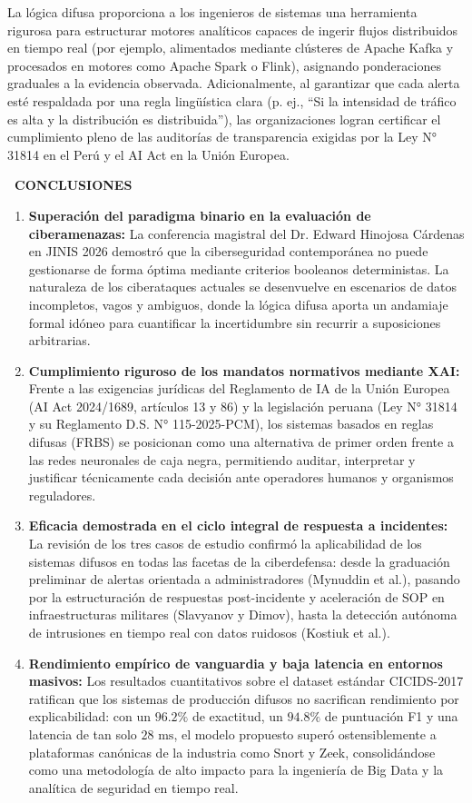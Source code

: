 \documentclass[12pt,a4paper]{article}
\newcommand{\llav}{\symbol{60}\symbol{60}}
\newcommand{\rlav}{\symbol{62}\symbol{62}}
\newcommand{\marcador}[1]{\llav\ #1\ \rlav}
\newcommand{\seccion}[1]{%
  \vspace{0.65cm}%
  {\centering\bfseries\fontsize{12pt}{14pt}\selectfont\marcador{\MakeUppercase{#1}}\par}%
  \vspace{0.30cm}%
}
\begin{document}
La lógica difusa proporciona a los ingenieros de sistemas una herramienta rigurosa para estructurar motores analíticos capaces de ingerir flujos distribuidos en tiempo real (por ejemplo, alimentados mediante clústeres de Apache Kafka y procesados en motores como Apache Spark o Flink), asignando ponderaciones graduales a la evidencia observada. Adicionalmente, al garantizar que cada alerta esté respaldada por una regla lingüística clara (p. ej., ``Si la intensidad de tráfico es alta y la distribución es distribuida''), las organizaciones logran certificar el cumplimiento pleno de las auditorías de transparencia exigidas por la Ley N° 31814 en el Perú y el AI Act en la Unión Europea.

\seccion{CONCLUSIONES}

\begin{enumerate}
    \item \textbf{Superación del paradigma binario en la evaluación de ciberamenazas:} La conferencia magistral del Dr. Edward Hinojosa Cárdenas en JINIS 2026 demostró que la ciberseguridad contemporánea no puede gestionarse de forma óptima mediante criterios booleanos deterministas. La naturaleza de los ciberataques actuales se desenvuelve en escenarios de datos incompletos, vagos y ambiguos, donde la lógica difusa aporta un andamiaje formal idóneo para cuantificar la incertidumbre sin recurrir a suposiciones arbitrarias.
    \item \textbf{Cumplimiento riguroso de los mandatos normativos mediante XAI:} Frente a las exigencias jurídicas del Reglamento de IA de la Unión Europea (AI Act 2024/1689, artículos 13 y 86) y la legislación peruana (Ley N° 31814 y su Reglamento D.S. N° 115-2025-PCM), los sistemas basados en reglas difusas (FRBS) se posicionan como una alternativa de primer orden frente a las redes neuronales de caja negra, permitiendo auditar, interpretar y justificar técnicamente cada decisión ante operadores humanos y organismos reguladores.
    \item \textbf{Eficacia demostrada en el ciclo integral de respuesta a incidentes:} La revisión de los tres casos de estudio confirmó la aplicabilidad de los sistemas difusos en todas las facetas de la ciberdefensa: desde la graduación preliminar de alertas orientada a administradores (Mynuddin et al.), pasando por la estructuración de respuestas post-incidente y aceleración de SOP en infraestructuras militares (Slavyanov y Dimov), hasta la detección autónoma de intrusiones en tiempo real con datos ruidosos (Kostiuk et al.).
    \item \textbf{Rendimiento empírico de vanguardia y baja latencia en entornos masivos:} Los resultados cuantitativos sobre el dataset estándar CICIDS-2017 ratifican que los sistemas de producción difusos no sacrifican rendimiento por explicabilidad: con un $96.2\%$ de exactitud, un $94.8\%$ de puntuación F1 y una latencia de tan solo $28\text{ ms}$, el modelo propuesto superó ostensiblemente a plataformas canónicas de la industria como Snort y Zeek, consolidándose como una metodología de alto impacto para la ingeniería de Big Data y la analítica de seguridad en tiempo real.
\end{enumerate}
\end{document}
